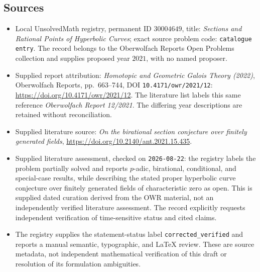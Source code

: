 \documentclass[11pt]{article}
\begin{document}
\subsection{Sources}
\begin{itemize}
\item Local UnsolvedMath registry, permanent ID \(30004649\), title: \emph{Sections and Rational Points of Hyperbolic Curves}; exact source problem code: \texttt{catalogue entry}. The record belongs to the Oberwolfach Reports Open Problems collection and supplies proposed year \(2021\), with no named proposer.
\item Supplied report attribution: \emph{Homotopic and Geometric Galois Theory (2022)}, Oberwolfach Reports, pp.\ 663--744, DOI \texttt{10.4171/owr/2021/12}: \url{https://doi.org/10.4171/owr/2021/12}. The literature list labels this same reference \emph{Oberwolfach Report 12/2021}. The differing year descriptions are retained without reconciliation.
\item Supplied literature source: \emph{On the birational section conjecture over finitely generated fields}, \url{https://doi.org/10.2140/ant.2021.15.435}.
\item Supplied literature assessment, checked on \texttt{2026-08-22}: the registry labels the problem partially solved and reports \(p\)-adic, birational, conditional, and special-case results, while describing the stated proper hyperbolic curve conjecture over finitely generated fields of characteristic zero as open. This is supplied dated curation derived from the OWR material, not an independently verified literature assessment. The record explicitly requests independent verification of time-sensitive status and cited claims.
\item The registry supplies the statement-status label \texttt{corrected\_verified} and reports a manual semantic, typographic, and LaTeX review. These are source metadata, not independent mathematical verification of this draft or resolution of its formulation ambiguities.
\end{itemize}
\end{document}
